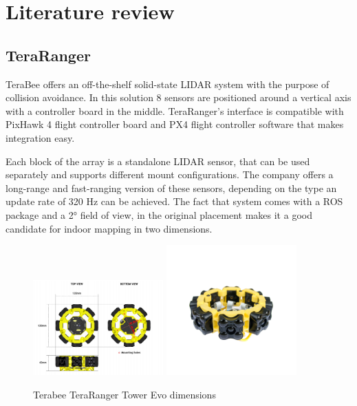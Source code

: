 \chapter{Literature review}

\section{TeraRanger}
TeraBee offers an off-the-shelf solid-state LIDAR system with the purpose of collision avoidance. In this 
solution 8 sensors are positioned around a vertical axis with a controller board in the middle. TeraRanger's
interface is compatible with PixHawk 4 flight controller board and PX4 flight controller software that makes
integration easy.

Each block of the array is a standalone LIDAR sensor, that can be used separately and supports different
mount configurations. The company offers a long-range and fast-ranging version of these sensors, depending 
on the type an update rate of 320 Hz can be achieved. The fact that system comes with a ROS package and a 
2° field of view, in the original placement makes it a good candidate for indoor mapping in two dimensions.

\begin{figure}[!ht]
    \centering
    \includegraphics[width=50mm, keepaspectratio]{figures/tera_ranger_tower.png}\hspace{1cm}
    \includegraphics[width=50mm, keepaspectratio]{figures/tera_ranger_tower_2.png}
    \caption{Terabee TeraRanger Tower Evo dimensions}
    \label{fig:teraranger_dimensions}
\end{figure}


